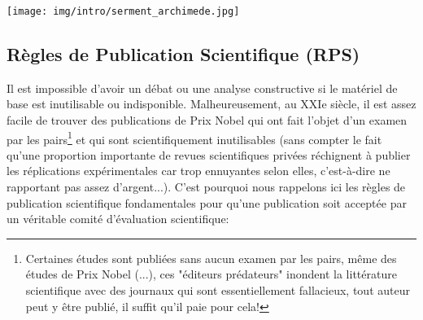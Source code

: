 	\begin{center}
		\texttt{[image: img/intro/serment\_archimede.jpg]}
	\end{center}

	\pagebreak
	\subsection{Règles de Publication Scientifique (RPS)}
	Il est impossible d'avoir un d\'ebat ou une analyse constructive si le mat\'eriel de base est inutilisable ou indisponible. Malheureusement, au XXIe siècle, il est assez facile de trouver des publications de Prix Nobel qui ont fait l'objet d'un examen par les pairs\footnote{Certaines \'etudes sont publi\'ees sans aucun examen par les pairs, même des \'etudes de Prix Nobel (...), ces "\'editeurs pr\'edateurs" inondent la litt\'erature scientifique avec des journaux qui sont essentiellement fallacieux, tout auteur peut y être publi\'e, il suffit qu'il paie pour cela!} et qui sont scientifiquement inutilisables (sans compter le fait qu'une proportion importante de revues scientifiques priv\'ees r\'echignent à publier les r\'eplications exp\'erimentales car trop ennuyantes selon elles, c'est-à-dire ne rapportant pas assez d'argent...). C'est pourquoi nous rappelons ici les règles de publication scientifique fondamentales pour qu'une publication soit accept\'ee par un v\'eritable comit\'e d'\'evaluation scientifique:
